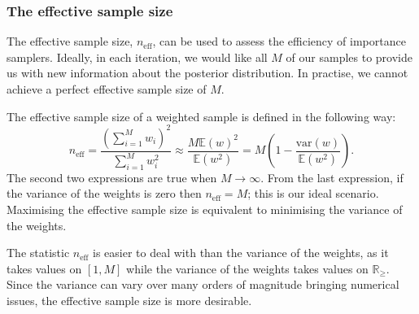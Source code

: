\documentclass[final]{siamltex}
\newcommand{\neff}{n_{\text{eff}}}
\newcommand{\E}{{\mathbb E}}
\DeclareMathOperator*{\argmin}{arg\,min}
\begin{document}


\subsubsection{The effective sample size}\label{sec:ess}

The effective sample size, $\neff$, can be used to assess the
efficiency of importance samplers. Ideally, in each iteration, we
would like all $M$ of our samples to provide us with new information
about the posterior distribution. In practise, we cannot achieve a
perfect effective sample size of $M$.

The effective sample size of a weighted sample is defined in the
following way:
\[
	\neff = \frac{\left(\sum_{i=1}^M \! w_i\right)^2}{\sum_{i=1}^M \! w_i^2} \approx \frac{M\E(w)^2}{\E(w^2)} = M\left(1 - \frac{\mbox{var}(w)}{\mathbb{E}(w^2)}\right).
\]
The second two expressions are true when $M\rightarrow\infty$. From
the last expression, if the variance of the weights is zero then
$\neff = M$; this is our ideal scenario. Maximising the effective
sample size is equivalent to minimising the variance of the weights.

The statistic $\neff$ is easier to deal with than the variance of the
weights, as it takes values on $[1, M]$ while the variance of the
weights takes values on $\mathbb{R}_\geq$. Since the variance can vary
over many orders of magnitude bringing numerical issues, the effective
sample size is more desirable.
\end{document}

